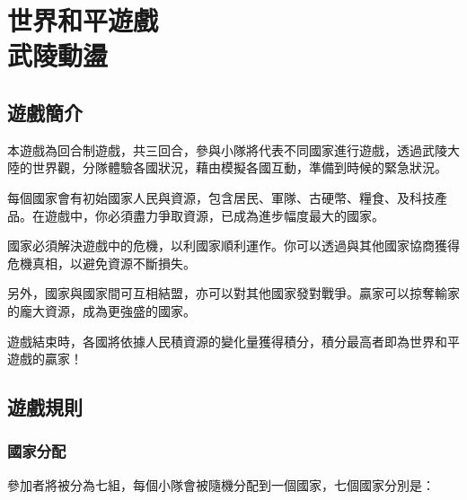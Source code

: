 \chapter{世界和平遊戲\\武陵動盪}

\section{遊戲簡介}
本遊戲為回合制遊戲，共三回合，參與小隊將代表不同國家進行遊戲，透過武陵大陸的世界觀，分隊體驗各國狀況，藉由模擬各國互動，準備到時候的緊急狀況。

每個國家會有初始國家人民與資源，包含居民、軍隊、古硬幣、糧食、及科技產品。在遊戲中，你必須盡力爭取資源，已成為進步幅度最大的國家。

國家必須解決遊戲中的危機，以利國家順利運作。你可以透過與其他國家協商獲得危機真相，以避免資源不斷損失。

另外，國家與國家間可互相結盟，亦可以對其他國家發對戰爭。贏家可以掠奪輸家的龐大資源，成為更強盛的國家。

遊戲結束時，各國將依據人民積資源的變化量獲得積分，積分最高者即為世界和平遊戲的贏家！

\section{遊戲規則}
\subsection{國家分配}
參加者將被分為七組，每個小隊會被隨機分配到一個國家，七個國家分別是：

